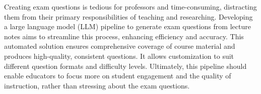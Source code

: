 

{
   Creating exam questions is tedious for professors and time-consuming, distracting them from their primary
   responsibilities of teaching and researching. Developing a large language model (LLM) pipeline to generate exam
questions from lecture notes aims to streamline this process, enhancing efficiency and accuracy. This automated
solution ensures comprehensive coverage of course material and produces high-quality, consistent questions.
It allows customization to suit different question formats and difficulty levels. Ultimately, this pipeline should
enable educators to focus more on student engagement and the quality of instruction, rather than stressing about
the exam questions.
	\vspace*{-1.2cm}
}

